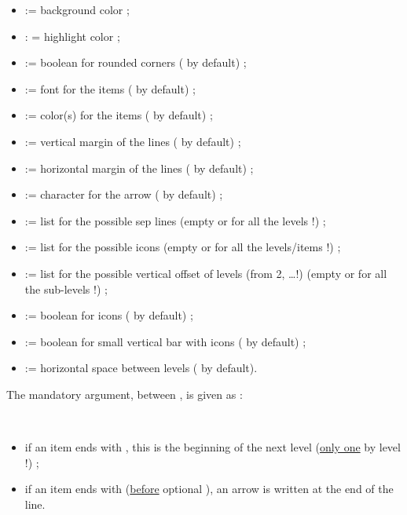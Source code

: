 \documentclass[11pt,a4paper]{ltxdoc}
\begin{document}
\begin{itemize}
	\item {} := background color ;
	\item {} : = highlight color ;
	\item {} := boolean for rounded corners ( by default) ;
	\item {} := font for the items ( by default) ;
	\item {} := color(s) for the items ( by default) ;
	\item {} := vertical margin of the lines (\MontreCode{6pt} by default) ;
	\item {} := horizontal margin of the lines (\MontreCode{12pt} by default) ;
	\item {} := character for the arrow ( by default) ;
	\item {} := list for the possible sep lines (empty or for all the levels !) ;
	\item {} := list for the possible icons (empty or for all the levels/items !) ;
	\item {} := list for the possible vertical offset of levels (from 2, \ldots !) (empty or for all the sub-levels !) ;
	\item {} := boolean for icons ( by default) ;
	\item {} := boolean for small vertical bar with icons ( by default) ;
	\item {} := horizontal space between levels ( by default).
\end{itemize}

\medskip

The mandatory argument, between , is given as :

\smallskip

\hfill{}\hfill~

\begin{itemize}
	\item if an item ends with \MontreCode{(*)}, this is the beginning of the next level (\underline{only one} by level !) ;
	\item if an item ends with \MontreCode{(>)} (\underline{before} optional \MontreCode{(*)}), an arrow is written at the end of the line.
\end{itemize}
\end{document}
